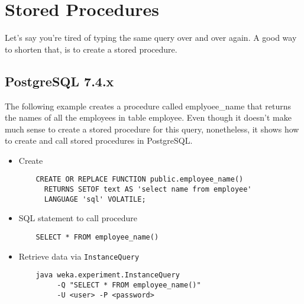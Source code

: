 \section{Stored Procedures}
Let's say you're tired of typing the same query over and over again. A good way to shorten that, is to create a stored procedure.

\subsection*{PostgreSQL 7.4.x}
The following example creates a procedure called emplyoee\_name that returns the names of all the employees in table employee. Even though it doesn't make much sense to create a stored procedure for this query, nonetheless, it shows how to create and call stored procedures in PostgreSQL.

\begin{itemize}
	\item Create
	\begin{verbatim}
	CREATE OR REPLACE FUNCTION public.employee_name()
	  RETURNS SETOF text AS 'select name from employee'
	  LANGUAGE 'sql' VOLATILE;
	\end{verbatim}

	\item SQL statement to call procedure
	\begin{verbatim}
	SELECT * FROM employee_name()
	\end{verbatim}

	\item Retrieve data via \texttt{InstanceQuery}
	\begin{verbatim}
	java weka.experiment.InstanceQuery
	     -Q "SELECT * FROM employee_name()"
	     -U <user> -P <password>
	\end{verbatim}
\end{itemize}

